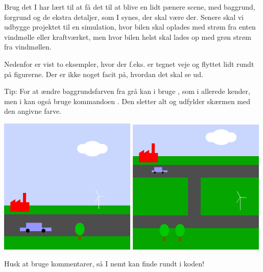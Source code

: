 \documentclass{ucph-handout}
\begin{document}
\begin{exercisebox}[adjusted title=Green City]
Brug det I har lært til at få det til at blive en lidt pænere scene,
med baggrund, forgrund og de ekstra detaljer, som I synes, der skal være
der. Senere skal vi udbygge projektet til en simulation, hvor bilen
skal oplades med strøm fra enten vindmølle eller kraftværket, men hvor
bilen helst skal lades op med grøn strøm fra vindmøllen.

Nedenfor er vist to eksempler, hvor der f.eks. er tegnet veje og
flyttet lidt rundt på figurerne. Der er ikke noget facit på, hvordan
det skal se ud.

\vspace{2mm}
\noindent
Tip: For at ændre baggrundsfarven fra grå  kan i bruge , som i
allerede kender, men i kan også bruge kommandoen .
Den sletter alt og udfylder skærmen med den angivne farve.

\begin{center}
  \includegraphics[width=0.49\textwidth]{../illustrations/images/elbil.png}
  \includegraphics[width=0.49\textwidth]{../illustrations/images/miniby.png}
\end{center}

\noindent
Husk at bruge kommentarer, så I nemt kan finde rundt i koden!
\end{exercisebox}
\end{document}
